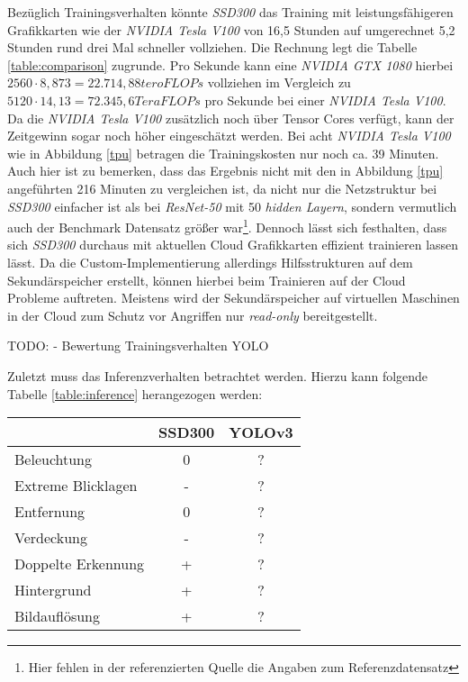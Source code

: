Bezüglich Trainingsverhalten könnte \textit{SSD300} das Training mit leistungsfähigeren Grafikkarten wie der \textit{NVIDIA Tesla V100} von 16,5 Stunden auf umgerechnet 5,2 Stunden rund drei Mal schneller vollziehen. Die Rechnung legt die Tabelle \ref{table:comparison} zugrunde. Pro Sekunde kann eine \textit{NVIDIA GTX 1080} hierbei $2560 \cdot 8,873 = 22.714,88 teroFLOPs$ vollziehen im Vergleich zu $5120 \cdot 14,13 = 72.345,6 TeraFLOPs$ pro Sekunde bei einer \textit{NVIDIA Tesla V100}. Da die \textit{NVIDIA Tesla V100} zusätzlich noch über Tensor Cores verfügt, kann der Zeitgewinn sogar noch höher eingeschätzt werden. Bei acht \textit{NVIDIA Tesla V100} wie in Abbildung \ref{tpu} betragen die Trainingskosten nur noch ca. 39 Minuten. Auch hier ist zu bemerken, dass das Ergebnis nicht mit den in Abbildung \ref{tpu} angeführten 216 Minuten zu vergleichen ist, da nicht nur die Netzstruktur bei \textit{SSD300} einfacher ist als bei \textit{ResNet-50} mit 50 \textit{hidden Layern}, sondern vermutlich auch der Benchmark Datensatz größer war\footnote{Hier fehlen in der referenzierten Quelle die Angaben zum Referenzdatensatz}. Dennoch lässt sich festhalten, dass sich \textit{SSD300} durchaus mit aktuellen Cloud Grafikkarten effizient trainieren lassen lässt. Da die Custom-Implementierung allerdings Hilfsstrukturen auf dem Sekundärspeicher erstellt, können hierbei beim Trainieren auf der Cloud Probleme auftreten. Meistens wird der Sekundärspeicher auf virtuellen Maschinen in der Cloud zum Schutz vor Angriffen nur \textit{read-only} bereitgestellt. 

TODO:
- Bewertung Trainingsverhalten YOLO

Zuletzt muss das Inferenzverhalten betrachtet werden. Hierzu kann folgende Tabelle \ref{table:inference} herangezogen werden:

\begin{center}
	\begin{tabular}[h]{l|c|c}
		 & SSD300 & YOLOv3 \\
		\hline
		Beleuchtung & 0 & ? \\
		Extreme Blicklagen & - & ? \\
		Entfernung & 0 & ? \\
		Verdeckung & - & ? \\
		Doppelte Erkennung & + & ? \\
		Hintergrund & + & ? \\
		Bildauflösung & + & ? \\
	\end{tabular}
	\label{table:inference}
\end{center}

